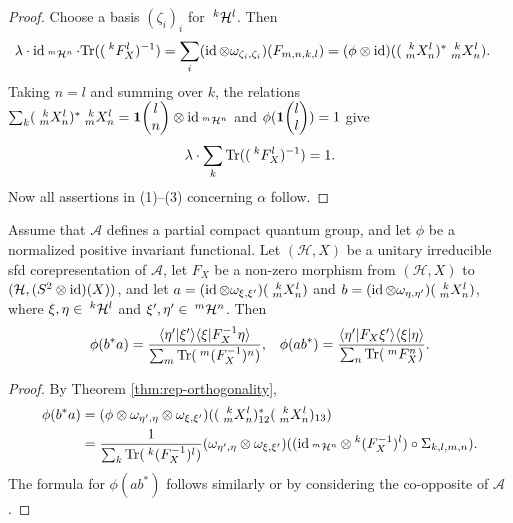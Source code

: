 \begin{proof}
  Choose a basis
  $(\zeta_{i})_{i}$ for $\Gru{\mathcal{H}}{k}{l}$. Then
  \begin{align*}
    \lambda \cdot \id_{\Gru{\mathcal{H}}{m}{n}} \cdot
    \Tr((\Gru{F_{X}}{k}{l})^{-1}) &= \sum_{i} (\id \otimes
    \omega_{\zeta_{i},\zeta_{i}})(F_{m,n,k,l}) = (\phi \otimes
    \id)((\Gr{X}{k}{l}{m}{n})^{*} \Gr{X}{k}{l}{m}{n}).
  \end{align*}
  Taking $n=l$ and summing over $k$, the relations $\sum_{k}
  (\Gr{X}{k}{l}{m}{n})^{*} \Gr{X}{k}{l}{m}{n} = \UnitC{l}{n}
  \otimes \id_{\Gru{\mathcal{H}}{m}{n}}$ and
  $\phi(\UnitC{l}{l})=1$ give
\begin{align*}
\lambda \cdot  \sum_{k} \Tr((\Gru{F_{X}}{k}{l})^{-1}) = 1.
\end{align*}
Now all assertions in (1)--(3) concerning $\alpha$ follow.
\end{proof}
\begin{Cor}\label{CorOrth}
  Assume that $\mathscr{A}$ defines a partial compact quantum group, and let $\phi$ be a normalized positive  invariant functional. Let $(\mathcal{H},X)$ be a unitary
  irreducible sfd corepresentation of $\mathscr{A}$, let
  $F_{X}$ be a non-zero morphism from $(\mathcal{H},X)$ to
  $(\mathcal{H},(S^{2} \otimes \id)(X))$, and let $a=(\id \otimes
  \omega_{\xi,\xi'})(\Gr{X}{k}{l}{m}{n})$ and $b=(\id \otimes
  \omega_{\eta,\eta'})(\Gr{X}{k}{l}{m}{n})$, where $\xi,\eta \in
  \Gru{\mathcal{H}}{k}{l}$ and $\xi',\eta' \in \Gru{\mathcal{H}}{m}{n}$.
  Then
\begin{align*}
  \phi(b^{*}a) &= \frac{\langle \eta'|\xi'\rangle \langle
    \xi|F^{-1}_{X}\eta\rangle}{\sum_{m}
    \Tr(\Gru{(F^{-1}_{X})}{m}{n})}, & \phi(ab^{*}) = \frac{\langle
    \eta'|F_{X}\xi'\rangle \langle \xi|\eta\rangle}{\sum_{n}
    \Tr(\Gru{F_{X}}{m}{n})}.
\end{align*}
\end{Cor}
\begin{proof}
  By Theorem \ref{thm:rep-orthogonality}, 
  \begin{align*}
    \phi(b^{*}a) &= (\phi \otimes \omega_{\eta',\eta} \otimes
    \omega_{\xi,\xi'})((\Gr{X}{k}{l}{m}{n})_{12}^{*}(\Gr{X}{k}{l}{m}{n})_{13})
    \\
    &= \frac{1}{\sum_{k} \Tr(\Gru{(F_{X}^{-1})}{k}{l})} 
    (\omega_{\eta',\eta} \otimes
    \omega_{\xi,\xi'})(   (
    \id_{\Gru{\mathcal{H}}{m}{n}} \otimes \Gru{(F_{X}^{-1})}{k}{l})
    \circ \Sigma_{k,l,m,n}). 
  \end{align*}
  The formula for $\phi(ab^{*})$ follows similarly or by considering
  the co-opposite of $\mathscr{A}$.
\end{proof}
